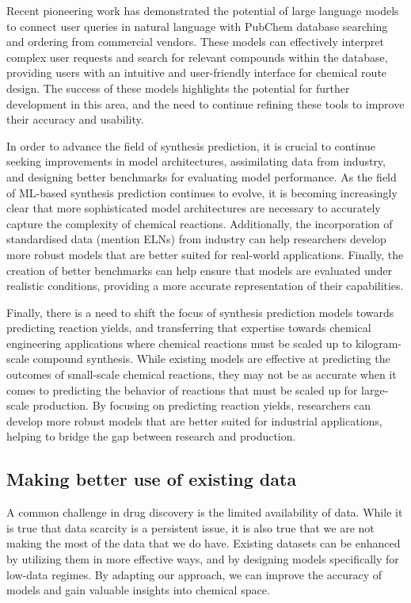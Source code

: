Recent pioneering work has demonstrated the potential of large language models to connect user queries in natural language with PubChem database searching and ordering from commercial vendors. These models can effectively interpret complex user requests and search for relevant compounds within the database, providing users with an intuitive and user-friendly interface for chemical route design. The success of these models highlights the potential for further development in this area, and the need to continue refining these tools to improve their accuracy and usability.

In order to advance the field of synthesis prediction, it is crucial to continue seeking improvements in model architectures, assimilating data from industry, and designing better benchmarks for evaluating model performance. As the field of ML-based synthesis prediction continues to evolve, it is becoming increasingly clear that more sophisticated model architectures are necessary to accurately capture the complexity of chemical reactions. Additionally, the incorporation of standardised data (mention ELNs) from industry can help researchers develop more robust models that are better suited for real-world applications. Finally, the creation of better benchmarks can help ensure that models are evaluated under realistic conditions, providing a more accurate representation of their capabilities.

Finally, there is a need to shift the focus of synthesis prediction models towards predicting reaction yields, and transferring that expertise towards chemical engineering applications where chemical reactions must be scaled up to kilogram-scale compound synthesis. While existing models are effective at predicting the outcomes of small-scale chemical reactions, they may not be as accurate when it comes to predicting the behavior of reactions that must be scaled up for large-scale production. By focusing on predicting reaction yields, researchers can develop more robust models that are better suited for industrial applications, helping to bridge the gap between research and production.

\subsection{Making better use of existing data}

A common challenge in drug discovery is the limited availability of data. While it is true that data scarcity is a persistent issue, it is also true that we are not making the most of the data that we do have. Existing datasets can be enhanced by utilizing them in more effective ways, and by designing models specifically for low-data regimes. By adapting our approach, we can improve the accuracy of models and gain valuable insights into chemical space.

